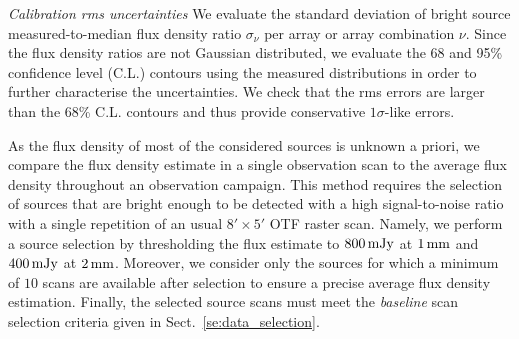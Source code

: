 \noindent \emph{Calibration rms uncertainties} We evaluate the standard
deviation of bright source measured-to-median flux density ratio
$\sigma_{\nu}$ per array or array combination $\nu$. {\lp Since the flux
density ratios are not Gaussian distributed, we
evaluate the 68 and 95\% confidence level (C.L.) contours using the
measured distributions in order to further characterise the
uncertainties. We check that the rms
errors are larger than the 68\% C.L. contours and thus provide
conservative $1\sigma$-like errors.}    

As the flux density of most of the considered sources is unknown a priori, we
compare the flux density estimate in a single observation scan to the
average flux density throughout an observation campaign. This method
requires the selection of sources that are bright enough to be detected with a high
signal-to-noise ratio with a single repetition of an usual
$8'\times 5'$ OTF raster scan. Namely, we perform a source
selection by thresholding the flux estimate to $800\,\rm{mJy}$ at
$1\,\rm{mm}$ and $400\,\rm{mJy}$ at $2\,\rm{mm}$. Moreover, we consider
only the sources for which a minimum of $10$ scans are available after
selection to ensure a precise average flux density
estimation. Finally, the selected source scans must meet the \emph{baseline}
scan selection criteria given in Sect.~\ref{se:data_selection}.

